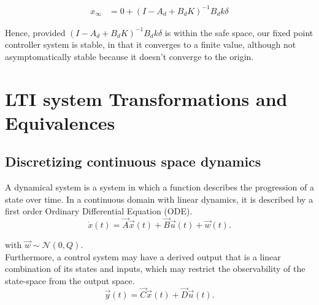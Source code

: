 \documentclass[runningheads,a4paper]{llncs}
\begin{document}
\begin{align*}
x_{\infty} &= 0 + (I - A_d + B_dK)^{-1}B_dk\delta
\end{align*}

Hence, provided $(I - A_d + B_dK)^{-1}B_dk\delta$ is within the safe space, our fixed point controller system is stable, in that it converges to a finite value, although not asymptomatically stable because it doesn't converge to the origin.


\section{LTI system Transformations and Equivalences} \label{sec:appendix:LTIbackground}

\subsection{Discretizing continuous space dynamics}

A dynamical system is a system in which a function describes the progression of a state over time. 
In a continuous domain with linear dynamics, it is described by a first order Ordinary Differential Equation (ODE).
\begin{equation}
\dot{x}(t)=\vec{A}\vec{x}(t)+\vec{B}\vec{u}(t) +\vec{w}(t).
\label{eq:dynamical}
\end{equation}

\noindent with $\vec{w} \sim \mathcal{N}(0,Q)$.\\
Furthermore, a control system may have a derived output that is a linear combination of its states and inputs, 
which may restrict the observability of the state-space from the output space.
\begin{equation}
\vec{y}(t)=\vec{C}\vec{x}(t)+\vec{D}\vec{u}(t).
\end{equation}
\end{document}
